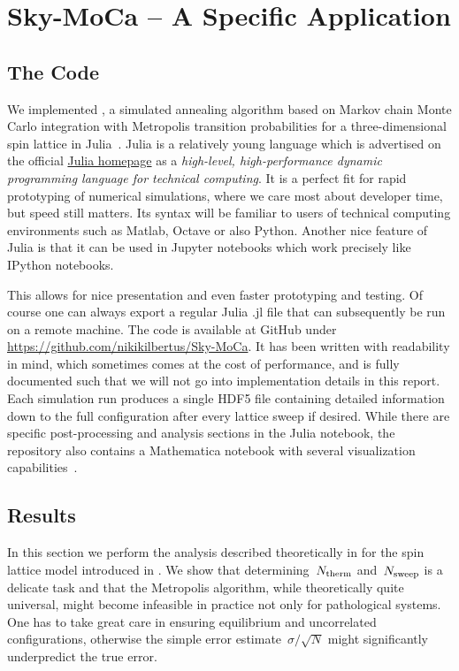 %
\chapter{Sky-MoCa -- A Specific Application}\label{chap:2}
%
\section{The Code}\label{sec:code}
%
We implemented , a simulated annealing algorithm based on
Markov chain Monte Carlo integration with Metropolis transition probabilities
for a three-dimensional spin lattice in Julia~\cite{julia}. Julia is a
relatively young language which is advertised on the official
\href{http://julialang.org/}{Julia homepage} as a \emph{high-level,
high-performance dynamic programming language for technical computing}. It is a
perfect fit for rapid prototyping of numerical simulations, where we care most
about developer time, but speed still matters. Its syntax will be familiar to
users of technical computing environments such as Matlab, Octave or also Python.
Another nice feature of Julia is that it can be used in Jupyter notebooks which
work precisely like IPython notebooks.

This allows for nice presentation and even faster prototyping and testing. Of
course one can always export a regular Julia \textsf{.jl} file that can
subsequently be run on a remote machine. The code is available at GitHub under
\href{https://github.com/nikikilbertus/Sky-MoCa}{\textsf{https://github.com/nikikilbertus/Sky-MoCa}}.
It has been written with readability in mind, which sometimes comes at the cost
of performance, and is fully documented such that we will not go into
implementation details in this report. Each simulation run produces a single
HDF5 file containing detailed information down to the full configuration after
every lattice sweep if desired. While there are specific post-processing and
analysis sections in the Julia notebook, the repository also contains a
Mathematica notebook with several visualization capabilities~\cite{mathematica}.
%
\section{Results}\label{sec:results}
%
In this section we perform the analysis described theoretically in
 for the spin lattice model introduced in
. We show that determining~$N_{\mathrm{therm}}$ and~$N_{\mathrm{sweep}}$ is a
delicate task and that the Metropolis algorithm, while theoretically quite
universal, might become infeasible in practice not only for pathological
systems. One has to take great care in ensuring equilibrium and uncorrelated
configurations, otherwise the simple error estimate~$\sigma/\sqrt{N}$ might
significantly underpredict the true error.

